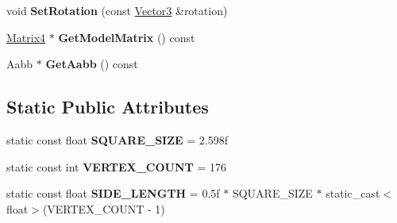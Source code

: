 \begin{DoxyCompactItemize}
\item 
\mbox{\label{class_flounder_1_1_terrain_a21709d10d197ace7aa66f9f5265f424c}} 
void {\bfseries Set\+Rotation} (const \hyperlink{class_flounder_1_1_vector3}{Vector3} \&rotation)
\item 
\mbox{\label{class_flounder_1_1_terrain_aebbfc129787ec8e236d950e6f3ab0b62}} 
\hyperlink{class_flounder_1_1_matrix4}{Matrix4} $\ast$ {\bfseries Get\+Model\+Matrix} () const
\item 
\mbox{\label{class_flounder_1_1_terrain_a663269b8f23cdb0893aaaca574c779ce}} 
Aabb $\ast$ {\bfseries Get\+Aabb} () const
\end{DoxyCompactItemize}
\subsection*{Static Public Attributes}
\begin{DoxyCompactItemize}
\item 
\mbox{\label{class_flounder_1_1_terrain_a2b10867b590870cc56cdb1456119a276}} 
static const float {\bfseries S\+Q\+U\+A\+R\+E\+\_\+\+S\+I\+ZE} = 2.\+598f
\item 
\mbox{\label{class_flounder_1_1_terrain_ab51c536e76da7afe4485872b693f27ec}} 
static const int {\bfseries V\+E\+R\+T\+E\+X\+\_\+\+C\+O\+U\+NT} = 176
\item 
\mbox{\label{class_flounder_1_1_terrain_a31ddb0c666d2687fcc18a41334436adc}} 
static const float {\bfseries S\+I\+D\+E\+\_\+\+L\+E\+N\+G\+TH} = 0.\+5f $\ast$ S\+Q\+U\+A\+R\+E\+\_\+\+S\+I\+Z\+E $\ast$ static\+\_\+cast$<$float$>$(\+V\+E\+R\+T\+E\+X\+\_\+\+C\+O\+U\+N\+T -\/ 1)
\end{DoxyCompactItemize}

